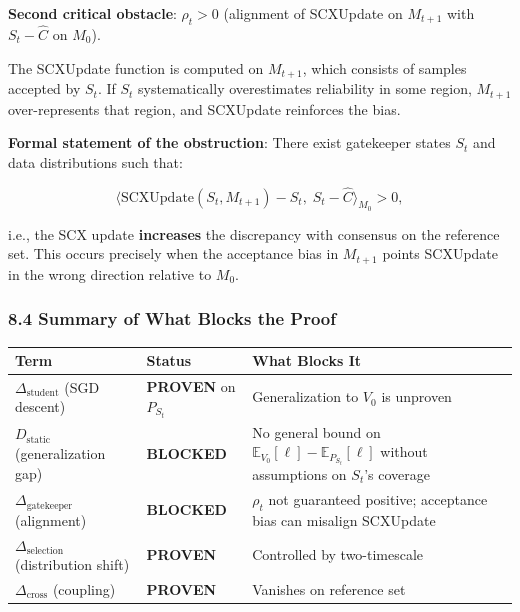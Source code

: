 \documentclass[
  12pt,
]{ctexart}
\begin{document}
\textbf{Second critical obstacle}: \(\rho_t > 0\) (alignment of
SCXUpdate on \(M_{t+1}\) with \(S_t - \hat{C}\) on \(M_0\)).

The SCXUpdate function is computed on \(M_{t+1}\), which consists of
samples accepted by \(S_t\). If \(S_t\) systematically overestimates
reliability in some region, \(M_{t+1}\) over-represents that region, and
SCXUpdate reinforces the bias.

\textbf{Formal statement of the obstruction}: There exist gatekeeper
states \(S_t\) and data distributions such that:

\[\langle \text{SCXUpdate}(S_t, M_{t+1}) - S_t, \; S_t - \hat{C} \rangle_{M_0} > 0,\]

i.e., the SCX update \textbf{increases} the discrepancy with consensus
on the reference set. This occurs precisely when the acceptance bias in
\(M_{t+1}\) points SCXUpdate in the wrong direction relative to \(M_0\).

\subsubsection{8.4 Summary of What Blocks the
Proof}\label{summary-of-what-blocks-the-proof}

\begin{longtable}[]{@{}
  >{\raggedright\arraybackslash}p{}
  >{\raggedright\arraybackslash}p{}
  >{\raggedright\arraybackslash}p{}@{}}
\toprule\noalign{}
\begin{minipage}[b]{\linewidth}\raggedright
Term
\end{minipage} & \begin{minipage}[b]{\linewidth}\raggedright
Status
\end{minipage} & \begin{minipage}[b]{\linewidth}\raggedright
What Blocks It
\end{minipage} \\
\midrule\noalign{}
\endhead
\bottomrule\noalign{}
\endlastfoot
\(\Delta_{\text{student}}\) (SGD descent) & \textbf{PROVEN} on
\(P_{S_t}\) & Generalization to \(V_0\) is unproven \\
\(D_{\text{static}}\) (generalization gap) & \textbf{BLOCKED} & No
general bound on \(\mathbb{E}_{V_0}[\ell] - \mathbb{E}_{P_{S_t}}[\ell]\)
without assumptions on \(S_t\)'s coverage \\
\(\Delta_{\text{gatekeeper}}\) (alignment) & \textbf{BLOCKED} &
\(\rho_t\) not guaranteed positive; acceptance bias can misalign
SCXUpdate \\
\(\Delta_{\text{selection}}\) (distribution shift) & \textbf{PROVEN} &
Controlled by two-timescale \\
\(\Delta_{\text{cross}}\) (coupling) & \textbf{PROVEN} & Vanishes on
reference set \\
\end{longtable}
\end{document}
